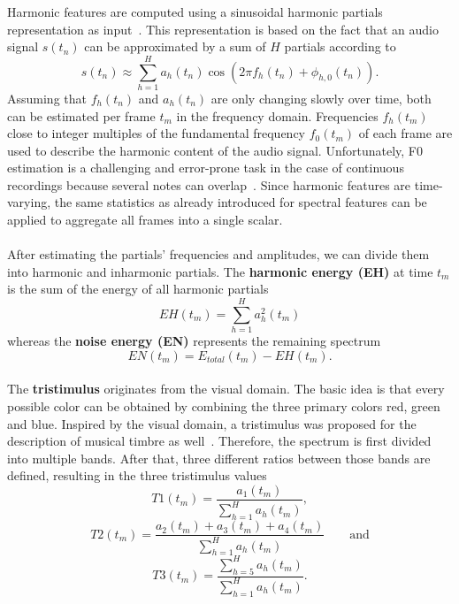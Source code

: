 Harmonic features are computed using a sinusoidal harmonic partials representation as input~\cite[p. 306]{siedenburg2019timbre}. This representation is based on the fact that an audio signal $s(t_n)$ can be approximated by a sum of $H$ partials according to
\begin{equation}
	s(t_n) \approx \sum_{h=1}^{H} a_h(t_n) \cos(2\pi f_h(t_n) + \phi_{h,0}(t_n)).
\end{equation}
Assuming that $f_h(t_n)$ and $a_h(t_n)$ are only changing slowly over time, both can be estimated per frame $t_m$ in the frequency domain. Frequencies $f_h(t_m)$ close to integer multiples of the fundamental frequency $f_0(t_m)$ of each frame are used to describe the harmonic content of the audio signal. Unfortunately, F0 estimation is a challenging and error-prone task in the case of continuous recordings because several notes can overlap~\cite{david2004efficient}. Since harmonic features are time-varying, the same statistics as already introduced for spectral features can be applied to aggregate all frames into a single scalar.\\~\\

After estimating the partials' frequencies and amplitudes, we can divide them into harmonic and inharmonic partials. The \textbf{harmonic energy (EH)} at time $t_m$ is the sum of the energy of all harmonic partials
\begin{equation}
   EH(t_m) = \sum_{h=1}^{H} a_h^{2}(t_m)
\end{equation}
whereas the \textbf{noise energy (EN)} represents the remaining spectrum
 \begin{equation}
 EN(t_m) = E_{total}(t_m) - EH(t_m).
 \end{equation}\\
 
The \textbf{tristimulus} originates from the visual domain. The basic idea is that every possible color can be obtained by combining the three primary colors red, green and blue. Inspired by the visual domain, a tristimulus was proposed for the description of musical timbre as well~\cite{pollard1982tristimulus}. Therefore, the spectrum is first divided into multiple bands. After that, three different ratios between those bands are defined, resulting in the three tristimulus values
\begin{equation}
T1(t_m) = \frac{a_1(t_m)}{\displaystyle \sum_{h=1}^{H} a_h(t_m)},
\end{equation}
\begin{equation}
T2(t_m) = \frac{a_2(t_m)+a_3(t_m)+a_4(t_m)}{\displaystyle \sum_{h=1}^{H} a_h(t_m)} \qquad \text{and}
\end{equation}
\begin{equation}
T3(t_m) = \frac{\displaystyle \sum_{h=5}^{H} a_h(t_m)}{\displaystyle \sum_{h=1}^{H} a_h(t_m)}.
\end{equation}\\

